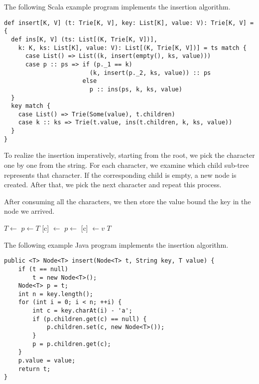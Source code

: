\documentclass{article}
\begin{document}
The following Scala example program implements the insertion
algorithm.

\lstset{language=Scala}
\begin{lstlisting}
def insert[K, V] (t: Trie[K, V], key: List[K], value: V): Trie[K, V] = {
  def ins[K, V] (ts: List[(K, Trie[K, V])],
    k: K, ks: List[K], value: V): List[(K, Trie[K, V])] = ts match {
      case List() => List((k, insert(empty(), ks, value)))
      case p :: ps => if (p._1 == k)
                        (k, insert(p._2, ks, value)) :: ps
                      else
                        p :: ins(ps, k, ks, value)
  }
  key match {
    case List() => Trie(Some(value), t.children)
    case k :: ks => Trie(t.value, ins(t.children, k, ks, value))
  }
}
\end{lstlisting}

To realize the insertion imperatively, starting from the root, we pick the character
one by one from the string. For each character, we examine which child sub-tree
represents that character. If the corresponding child is empty, a new node is
created. After that, we pick the next character and repeat this process.

After consuming all the characters, we then store the
value bound the key in the node we arrived.

\begin{algorithmic}[1]
    \State $T \gets $ 
  \EndIf
  \State $p \gets T$
      \State {}[c] $\gets$ 
    \EndIf
    \State $p \gets $ [c]
  \EndFor
  \State {} $\gets v$
  \State \Return $T$
\EndFunction
\end{algorithmic}

The following example Java program implements the insertion algorithm.

\lstset{language=Java}
\begin{lstlisting}
public <T> Node<T> insert(Node<T> t, String key, T value) {
    if (t == null)
        t = new Node<T>();
    Node<T> p = t;
    int n = key.length();
    for (int i = 0; i < n; ++i) {
        int c = key.charAt(i) - 'a';
        if (p.children.get(c) == null) {
            p.children.set(c, new Node<T>());
        }
        p = p.children.get(c);
    }
    p.value = value;
    return t;
}
\end{lstlisting}

\end{document}
